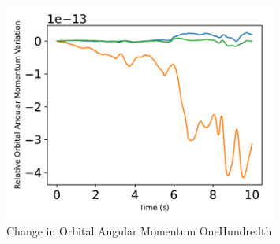 \begin{figure}[htbp]\centerline{\includegraphics[width=0.8\textwidth]{AutoTeX/ChangeInOrbitalAngularMomentumOneHundredth}}\caption{Change in Orbital Angular Momentum OneHundredth}\label{fig:ChangeInOrbitalAngularMomentumOneHundredth}\end{figure}